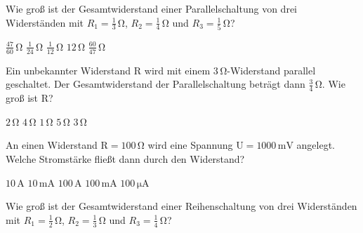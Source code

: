\documentclass[11pt]{exam}
\begin{document}
\setlength{\voffset}{-0.5in}
\setlength{\headsep}{5pt}

\hspace{2mm}
 \hspace{5mm}
\vspace{4mm}

\begin{questions}

\question Wie groß ist der Gesamtwiderstand einer Parallelschaltung von drei Widerständen mit \(R_1=\mathrm{\frac{1}{3}\,\Omega}\), \(R_2=\mathrm{\frac{1}{4}\,\Omega}\) und \(R_3=\mathrm{\frac{1}{5}\,\Omega}\)?

\begin{choices}
	\choice \(\mathrm{\frac{47}{60}\,\Omega}\)
	\choice \(\mathrm{\frac{1}{24}\,\Omega}\)
	\choice \(\mathrm{\frac{1}{12}\,\Omega}\)
	\choice \(\mathrm{12\,\Omega}\)
	\choice \(\mathrm{\frac{60}{47}\,\Omega}\)
\end{choices}

\vspace{3mm}\question Ein unbekannter Widerstand \(\mathrm{R}\) wird mit einem \(\mathrm{3\,\Omega}\)-Widerstand parallel geschaltet. Der Gesamtwiderstand der Parallelschaltung beträgt dann \(\mathrm{\frac{3}{4}\,\Omega}\). Wie groß ist \(\mathrm{R}\)?

\begin{choices}
	\choice \(\mathrm{2\,\Omega}\)
	\choice \(\mathrm{4\,\Omega}\)
	\choice \(\mathrm{1\,\Omega}\)
	\choice \(\mathrm{5\,\Omega}\)
	\choice \(\mathrm{3\,\Omega}\)
\end{choices}

\vspace{3mm}\question An einen Widerstand \(\mathrm{R=100\,\Omega}\) wird eine Spannung \(\mathrm{U=1000\,mV}\) angelegt. Welche Stromstärke fließt dann durch den Widerstand?

\begin{choices}
	\choice \(\mathrm{10\,A}\)
	\choice \(\mathrm{10\,mA}\)
	\choice \(\mathrm{100\,A}\)
	\choice \(\mathrm{100\,mA}\)
	\choice \(\mathrm{100\,\mu A}\)
\end{choices}

\vspace{3mm}\question Wie groß ist der Gesamtwiderstand einer Reihenschaltung von drei Widerständen mit \(R_1=\mathrm{\frac{1}{2}\,\Omega}\), \(R_2=\mathrm{\frac{1}{3}\,\Omega}\) und \(R_3=\mathrm{\frac{1}{4}\,\Omega}\)?


\end{questions}
\end{document}
